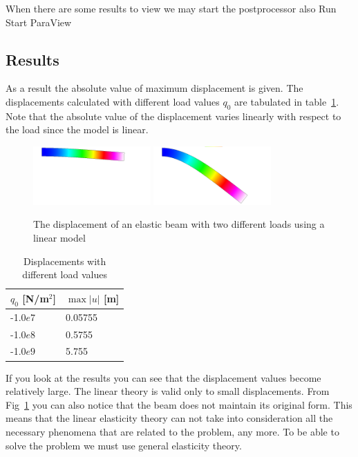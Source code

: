 When there are some results to view we may start the postprocessor also
\ttbegin
Run
  Start ParaView
\ttend


\subsection*{Results}

As a result the absolute value of maximum displacement is given. The 
displacements calculated with different load values $q_0$ are tabulated in 
table~\ref{tb:struct3a}. Note that the absolute value of the
displacement varies linearly with respect to the load since the model
is linear.

\begin{figure}[h!]
\begin{center}
  \includegraphics[width=0.4\textwidth,angle=0]{beam1.png}
  \includegraphics[width=0.4\textwidth,angle=0]{beam2.png}
  \caption{The displacement of an elastic beam with two different loads
using a linear model}
  \label{fig:elast_beam1}
\end{center}
\end{figure}

\begin{table}[h]
\caption{Displacements with different load values}
\label{tb:struct3a}
\begin{center}
\begin{tabular}{ll} \hline
$q_0$ [N/m$^2$] & $\max |u|$ [m] \\ \hline
-1.0$e7$ & 0.05755 \\
-1.0$e8$ & 0.5755 \\
-1.0$e9$ & 5.755 \\ \hline
\end{tabular}
\end{center}
\end{table}

If you look at the results you can see that the displacement values
become relatively large. The linear theory is valid only to small 
displacements. From Fig~\ref{fig:elast_beam1} you can also notice that the
beam does not maintain its original form. This means that the linear 
elasticity theory can not take into consideration all the necessary 
phenomena that are related to the problem, any more. To be able to 
solve the problem we must use general elasticity theory.


